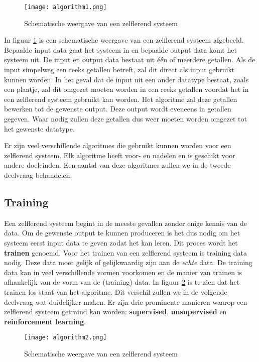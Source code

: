 \begin{figure}[h]
  \centering
    \texttt{[image: algorithm1.png]}
  \caption{Schematische weergave van een zelflerend systeem}
  \label{fig:algorithm1}
\end{figure}

In figuur \ref{fig:algorithm1}  is een schematische weergave van een zelflerend systeem afgebeeld. Bepaalde input data gaat het systeem in en bepaalde output data komt het systeem uit. De input en output data bestaat uit \'e\'en of meerdere getallen. Als de input simpelweg een reeks getallen betreft, zal dit direct als input gebruikt kunnen worden. In het geval dat de input uit een ander datatype bestaat, zoals een plaatje, zal dit omgezet moeten worden in een reeks getallen voordat het in een zelflerend systeem gebruikt kan worden. Het algoritme zal deze getallen bewerken tot de gewenste output. Deze output wordt eveneens in getallen gegeven. Waar nodig zullen deze getallen dus weer moeten worden omgezet tot het gewenste datatype.

Er zijn veel verschillende algoritmes die gebruikt kunnen worden voor een zelflerend systeem. Elk algoritme heeft voor- en nadelen en is geschikt voor andere doeleinden. Een aantal van deze algoritmes zullen we in de tweede deelvraag behandelen. 

\subsection{Training}

Een zelflerend systeem begint in de meeste gevallen zonder enige kennis van de data. Om de gewenste output te kunnen produceren is het dus nodig om het systeem eerst input data te geven zodat het kan leren. Dit proces wordt het \textbf{trainen} genoemd. Voor het trainen van een zelflerend systeem is training data nodig. Deze data moet gelijk of gelijkwaardig zijn aan de \textit{echte} data. De training data kan in veel verschillende vormen voorkomen en de manier van trainen is afhankelijk van de vorm van de (training) data. In figuur \ref{fig:algorithm2}  is te zien dat het trainen los staat van het algoritme. Dit verschil zullen we in de volgende deelvraag wat duidelijker maken. 
Er zijn drie prominente manieren waarop een zelflerend systeem getraind kan worden: \textbf{supervised}, \textbf{unsupervised} en \textbf{reinforcement learning}.

\begin{figure}[H]
  \centering
    \texttt{[image: algorithm2.png]}
  \caption{Schematische weergave van een zelflerend systeem}
  \label{fig:algorithm2}
\end{figure}

